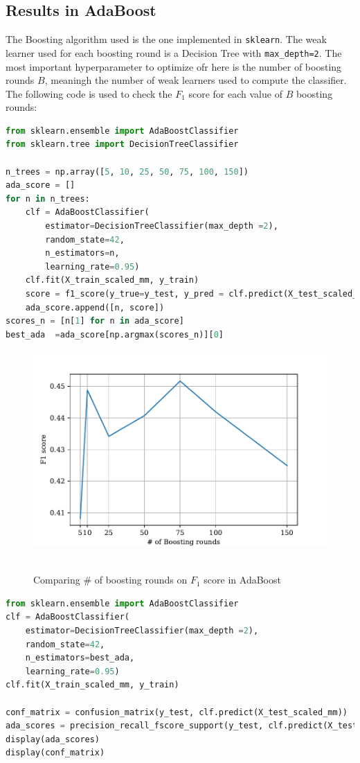 \subsection{Results in AdaBoost}
The Boosting algorithm used is the one implemented in \texttt{sklearn}. The weak learner used for each boosting round is a Decision Tree with \texttt{max\_depth=2}. The most important hyperparameter to optimize ofr here is the number of boosting rounds \(B\), meaningh the number of weak learners used to compute the classifier. The following code is used to check the \(F_1\) score for each value of \(B\) boosting rounds:
\begin{lstlisting}[language=Python, caption= Optimizing the number of Boosting rounds for AdaBoost]
from sklearn.ensemble import AdaBoostClassifier
from sklearn.tree import DecisionTreeClassifier

n_trees = np.array([5, 10, 25, 50, 75, 100, 150])
ada_score = []
for n in n_trees:
    clf = AdaBoostClassifier(
        estimator=DecisionTreeClassifier(max_depth =2),
        random_state=42,
        n_estimators=n,
        learning_rate=0.95)
    clf.fit(X_train_scaled_mm, y_train)
    score = f1_score(y_true=y_test, y_pred = clf.predict(X_test_scaled_mm))
    ada_score.append([n, score])
scores_n = [n[1] for n in ada_score]
best_ada  =ada_score[np.argmax(scores_n)][0]
\end{lstlisting}
\begin{figure}[htb]
    \centering
    \includegraphics[scale=0.7]{pictures/ada_score.pdf}\
    \caption{Comparing \# of boosting rounds on \(F_1\) score in AdaBoost}
    \label{fig_random_forest_score}
\end{figure}
\begin{lstlisting}[language=Python, caption= Deploying Adaboost with the optimal number of boosting rounds]
from sklearn.ensemble import AdaBoostClassifier
clf = AdaBoostClassifier(
    estimator=DecisionTreeClassifier(max_depth =2),
    random_state=42,
    n_estimators=best_ada,
    learning_rate=0.95)
clf.fit(X_train_scaled_mm, y_train)

conf_matrix = confusion_matrix(y_test, clf.predict(X_test_scaled_mm))
ada_scores = precision_recall_fscore_support(y_test, clf.predict(X_test_scaled_mm))
display(ada_scores)
display(conf_matrix)
\end{lstlisting}
